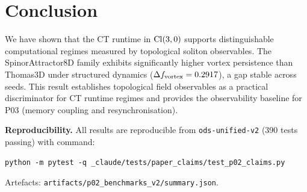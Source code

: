 \documentclass[11pt,a4paper]{article}
\begin{document}
\section{Conclusion}

We have shown that the CT runtime in $\mathrm{Cl}(3,0)$ supports distinguishable
computational regimes measured by topological soliton observables.
The SpinorAttractor8D family exhibits significantly higher vortex
persistence than Thomas3D under structured dynamics
($\Delta f_{\mathrm{vortex}} = 0.2917$), a gap stable across seeds.
This result establishes topological field observables as a practical
discriminator for CT runtime regimes and provides the observability
baseline for P03 (memory coupling and resynchronisation).

\bigskip
\noindent\textbf{Reproducibility.}
All results are reproducible from
\texttt{ods-unified-v2} (390 tests passing)
with command:
\begin{verbatim}
python -m pytest -q _claude/tests/paper_claims/test_p02_claims.py
\end{verbatim}
Artefacts: \texttt{artifacts/p02\_benchmarks\_v2/summary.json}.



\end{document}
